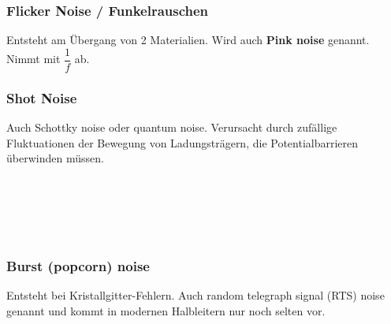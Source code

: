 
\subsubsection{Flicker Noise / Funkelrauschen}
Entsteht am Übergang von 2 Materialien. Wird auch \textbf{Pink noise} genannt.
Nimmt mit $\dfrac{1}{f}$ ab.


\subsubsection{Shot Noise}
\begin{minipage}[t]{0.3\textwidth}
	\vspace{0pt}
	Auch Schottky noise oder quantum noise. Verursacht durch zufällige Fluktuationen der Bewegung von Ladungsträgern, die Potentialbarrieren überwinden müssen.
\end{minipage}\hspace{0.05\textwidth}
\begin{minipage}[t]{0.3\textwidth}
	\vspace{0pt}
\end{minipage}\hspace{0.05\textwidth}
\begin{minipage}[t]{0.3\textwidth}
	\\
	\\
	\\
	\\
\end{minipage}
\vspace{2mm}

\subsubsection{Burst (popcorn) noise}
Entsteht bei Kristallgitter-Fehlern. Auch random telegraph signal (RTS) noise genannt und kommt in modernen Halbleitern nur noch selten vor.


